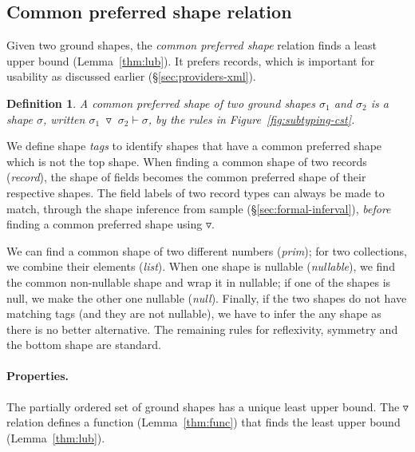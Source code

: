 \documentclass[10pt,preprint,clearpagebib]{sigplanconf}
\newcommand{\kvd}[1]{\textnormal{\textcolor{kvdclr}{\sffamily #1}}}
\newcommand{\tsep}[0]{\; \triangledown \;}
\newtheorem{definition}{Definition}
\begin{document}
\noindent


\subsection{Common preferred shape relation}
\label{sec:inference-commonsuper}

Given two ground shapes, the \emph{common preferred shape} relation finds a least upper bound
(Lemma~\ref{thm:lub}). It prefers records, which is important for usability as discussed
earlier (\S\ref{sec:providers-xml}).

\begin{definition}
A \emph{common preferred shape} of two ground shapes $\sigma_1$ and $\sigma_2$ is a shape $\sigma$, written 
$\sigma_1 \tsep \sigma_2 \vdash \sigma$, by the rules in 
Figure~\ref{fig:subtyping-cst}.
\end{definition}

\noindent
We define shape \emph{tags} to identify shapes that have a common preferred shape which is not the
top shape. When finding a common shape of two records (\emph{record}), the shape of fields becomes the common preferred shape of their 
respective shapes. The field labels of two record types can always be made to match,
through the shape inference from sample (\S\ref{sec:formal-inferval}),
\emph{before} finding a common preferred shape using $\triangledown$.

We can find a common shape of two different numbers (\emph{prim}); for two collections,
we combine their elements (\emph{list}). When one shape is nullable (\emph{nullable}), we find
the common non-nullable shape and wrap it in \kvd{nullable}; if one of the shapes is \kvd{null}, 
we make the other one nullable (\emph{null}). Finally, if the two shapes do not have matching tags 
(and they are not nullable), we have to infer the \kvd{any} shape as there is no better alternative. 
The remaining rules for reflexivity, symmetry and the bottom shape are standard.

\paragraph{Properties.}
The partially ordered set of ground shapes has a unique least upper bound.
The $\triangledown$ relation defines a function (Lemma~\ref{thm:func}) that finds 
the least upper bound (Lemma~\ref{thm:lub}). 
\end{document}

